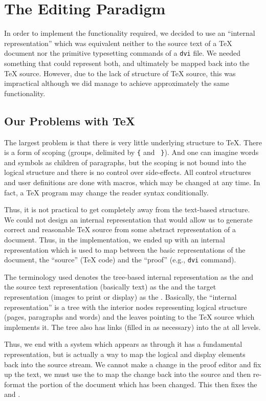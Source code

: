 \section{The Editing Paradigm}

In order to implement the functionality required, we decided to use an
``internal representation'' which was equivalent neither to the source text
of a {\TeX} document nor the primitive typesetting commands of a {\tt dvi}
file.  We needed something that could represent both, and ultimately be
mapped back into the {\TeX} source.  However, due to the lack of structure
of {\TeX} source, this was impractical although we did manage to achieve
approximately the same functionality.

\subsection{Our Problems with \TeX}

The largest problem is that there is very little underlying structure to
{\TeX}.  There is a form of scoping (groups, delimited by {\tt \{} and {\tt
\}}).  And one can imagine words and symbols as children of paragraphs, but
the scoping is not bound into the logical structure and there is no control
over side-effects.  All control structures and user definitions are done
with macros, which may be changed at any time.  In fact, a {\TeX} program
may change the reader syntax conditionally.

Thus, it is not practical to get completely away from the text-based
structure.  We could not design an internal representation that would
allow us to generate correct and reasonable {\TeX} source from some
abstract representation of a document.  Thus, in the implementation,
we ended up with an internal representation which is used to map
between the basic representations of the document, the ``source''
({\TeX} code) and the ``proof'' (e.g., {\tt dvi} command).

The terminology used denotes the tree-based internal representation as
the {\IRI} and the source text representation (basically {\ASCII} text)
as the {\IRS} and the target representation (images to print or display)
as the {\IRT}.  Basically, the ``internal representation'' is a tree
with the interior nodes representing logical structure (pages, paragraphs
and words) and the leaves pointing to the {\TeX} source which implements
it.  The tree also has links (filled in as necessary) into the {\IRT}
at all levels.

Thus, we end with a system which appears as through it has a fundamental
representation, but is actually a way to map the logical and display
elements back into the source stream.  We cannot make a change in the
proof editor and fix up the text, we must use the {\IRI} to map the
change back into the source and then re-format the portion of the
document which has been changed.  This then fixes the {\IRI} and {\IRT}.

